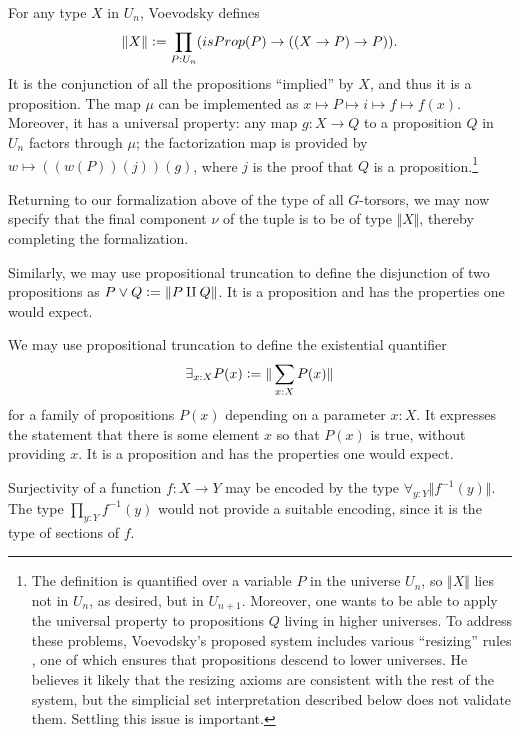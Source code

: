 \documentclass[letter,12pt]{amsart}
\theoremstyle{definition}
\theoremstyle{remark}
\numberwithin{equation}{section}
\newcommand{\nonempty}[1]{{\Vert #1 \Vert}}
\newcommand{\defeq}{\vcentcolon=}
\begin{document}
For any type $X$ in $U_n$, Voevodsky defines $$\nonempty{X} \defeq \prod_{P:U_n} ( isProp(P) \to ((X \to P) \to P) ).$$
It is the conjunction of all the propositions ``implied'' by $X$, and thus
it is a proposition.  The map $\mu$ can be implemented as $x \mapsto P \mapsto i \mapsto f \mapsto f(x)$.  Moreover, it has a
universal property: any map $g : X \to Q$ to a proposition $Q$ in $U_n$ factors through $\mu$; the factorization map is provided by $ w \mapsto
((w(P))(j))(g)$, where $j$ is the proof that $Q$ is a proposition.\footnote{The definition is quantified over a variable $P$ in the universe
  $U_n$, so $\nonempty{X}$ lies not in $U_n$, as desired, but in $U_{n+1}$.
  Moreover, one wants to be able to apply the universal property to propositions $Q$ living in higher universes.
  To address these problems, Voevodsky's proposed system includes various ``resizing'' rules \citep{VV-resizing}, one of which ensures that
  propositions descend to lower universes.  He believes it likely that the resizing axioms are consistent with the rest of the system, but the
  simplicial set interpretation described below does not validate them.  Settling this issue is important.
}

Returning to our formalization above of the type of all $G$-torsors, we may now specify that the final component $\nu$ of the tuple is to be of
type $\nonempty{X}$, thereby completing the formalization.

Similarly, we may use propositional truncation to define the disjunction of two propositions as $P \vee Q \defeq \nonempty{P \amalg Q}$.  It is
a proposition and has the properties one would expect.

We may use propositional truncation to define the existential quantifier $$\exists _{x:X} P(x) \defeq \nonempty{ \sum _{x:X} P(x) }$$ for a family of
propositions $P(x)$ depending on a parameter $x:X$.  It expresses the statement that there is some element $x$ so that $P(x)$ is true, without
providing $x$.
It is a proposition and has the properties one would expect.

Surjectivity of a function $f : X \to Y$ may be encoded by the type $\forall _{y:Y} \nonempty{ f^{-1} (y) }$.  The type $\prod_{y:Y} f^{-1} (y)$
would not provide a suitable encoding, since it is the type of sections of $f$.
\end{document}
